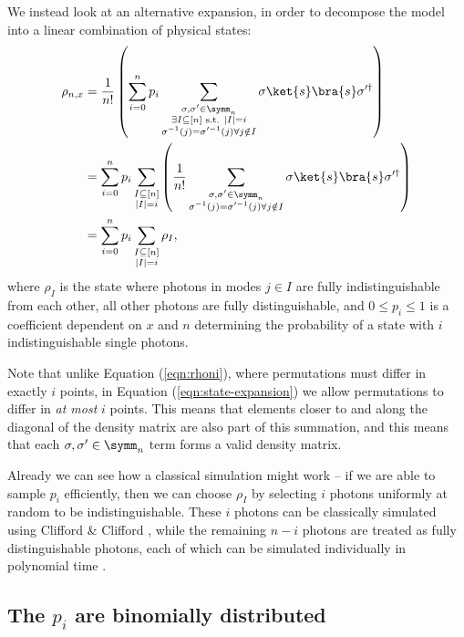 We instead look at an alternative expansion, in order to decompose the model into a linear combination of physical states:
\begin{align}
\rho_{n,x} &= \frac{1}{n!}\left(\sum_{i=0}^np_i\sum_{\substack{\sigma,\sigma'\in\symm_n\\\exists I\subseteq [n] \textrm{ s.t. } |I|=i\\\sigma^{-1}(j)=\sigma'^{-1}(j)\forall j \notin I}}\sigma\ket{s}\bra{s}\sigma'^\dagger\right)\label{eqn:state-expansion}\\
&= \sum_{i=0}^np_i\sum_{\substack{I\subseteq[n]\\|I|=i}}\left(\frac{1}{n!}\sum_{\substack{\sigma,\sigma'\in\symm_n\\\sigma^{-1}(j)=\sigma'^{-1}(j)\forall j \notin I}}\sigma\ket{s}\bra{s}\sigma'^\dagger\right)\\
&= \sum_{i=0}^np_i\sum_{\substack{I\subseteq[n]\\|I|=i}}\rho_I, \label{eq:newrho}
\end{align}
where $\rho_I$ is the state where photons in modes $j \in I$ are fully indistinguishable from each other, all other photons are fully distinguishable, and $0 \leq p_i \leq 1$ is a coefficient dependent on $x$ and $n$ determining the probability of a state with $i$ indistinguishable single photons.

Note that unlike Equation (\ref{eqn:rhoni}), where permutations must differ in exactly $i$ points, in Equation (\ref{eqn:state-expansion}) we allow permutations to differ in \emph{at most} $i$ points. 
This means that elements closer to and along the diagonal of the density matrix are also part of this summation, and this means that each $\sigma,\sigma' \in \symm_n$ term forms a valid density matrix.

Already we can see how a classical simulation might work -- if we are able to sample $p_i$ efficiently, then we can choose $\rho_I$ by selecting $i$ photons uniformly at random to be indistinguishable. 
These $i$ photons can be classically simulated using Clifford \& Clifford \cite{clifford2017}, while the remaining $n-i$ photons are treated as fully distinguishable photons, each of which can be simulated individually in polynomial time \cite{aaronson2014,neville2017}.


\subsection{The $p_i$ are binomially distributed}
\label{sec:understanding-pi}

